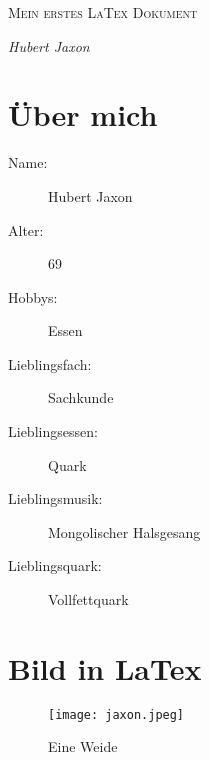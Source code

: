 \documentclass[12pt, a4paper]{article} %
\begin{document}

\thispagestyle{empty}

\begin{title}
	
	\vspace{5cm}
	
	{\scshape\Huge Mein erstes LaTex Dokument \par}

	\vspace{5cm}
	{\Large\itshape Hubert Jaxon \par} %
	

\end{title}

\newpage

\tableofcontents %

\newpage

\section{\"Uber mich}

\begin{description}
\item[Name:]
Hubert Jaxon %
\item[Alter:] 
69
\item[Hobbys:]
Essen
\item[Lieblingsfach:]
Sachkunde
\item[Lieblingsessen:]
Quark
\item[Lieblingsmusik:]
Mongolischer Halsgesang
\item[Lieblingsquark:] %
Vollfettquark
\end{description}

\section{Bild in LaTex}


\begin{figure}[h]%
\centering\texttt{[image: jaxon.jpeg]}\caption{Eine Weide}
\end{figure}
\end{document}
